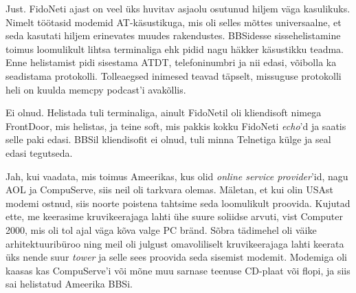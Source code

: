 
Just. FidoNeti ajast on veel üks huvitav asjaolu osutunud 
hiljem väga kasulikuks. Nimelt töötasid modemid
AT-käsustikuga, mis 
oli selles mõttes universaalne, et seda kasutati hiljem 
erinevates muudes rakendustes. BBSidesse sissehelistamine toimus loomulikult
lihtsa terminaliga ehk pidid nagu häkker käsustikku teadma. Enne 
helistamist pidi sisestama ATDT, telefoninumbri ja nii edasi, võibolla ka
seadistama protokolli. Tolleaegsed inimesed teavad täpselt, 
missuguse protokolli heli on kuulda memcpy podcast'i avakõllis. 


Ei olnud. Helistada tuli terminaliga, ainult FidoNetil oli kliendisoft 
nimega FrontDoor, mis helistas, ja teine soft, mis pakkis kokku FidoNeti 
\emph{echo}'d ja saatis selle paki edasi. BBSil kliendisofit ei olnud, tuli minna Telnetiga külge ja seal 
edasi tegutseda.


Jah, kui vaadata, mis toimus Ameerikas, kus olid 
\emph{online service provider}'id, nagu AOL ja 
CompuServe, siis neil oli tarkvara olemas. Mäletan, et 
kui olin USAst modemi ostnud, siis noorte poistena tahtsime seda loomulikult 
proovida. Kujutad ette, me keerasime kruvikeerajaga lahti 
ühe suure soliidse arvuti, vist Computer 2000, mis oli 
tol ajal väga kõva valge PC bränd. Sõbra tädimehel oli 
väike arhitektuuribüroo ning meil oli julgust 
omavoliliselt kruvikeerajaga lahti keerata üks nende suur \emph{tower} ja 
selle sees proovida seda sisemist modemit. Modemiga oli kaasas kas 
CompuServe'i või mõne muu sarnase teenuse CD-plaat või flopi, ja siis sai helistatud Ameerika BBSi. 

